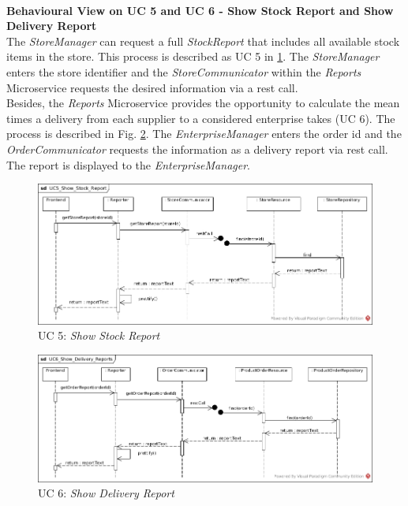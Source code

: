		 \noindent
		 \\
		\textbf{Behavioural View on UC 5 and UC 6 - Show Stock Report and Show Delivery Report} \\
		The \textit{StoreManager} can request a full \textit{StockReport} that includes all available stock items in the store. This process is described as UC 5 in \ref{MS_UC5}. The \textit{StoreManager} enters the store identifier and the \textit{StoreCommunicator} within the \textit{Reports} Microservice requests the desired information via a rest call.
		\\
		Besides, the \textit{Reports} Microservice provides the opportunity to calculate the mean times a delivery from each supplier to a considered enterprise takes (UC 6). The process is described in  Fig. \ref{MS_UC6}. The \textit{EnterpriseManager} enters the order id and the \textit{OrderCommunicator} requests the information as a delivery report via rest call. The report is displayed to the \textit{EnterpriseManager}.
		
	
			
			\begin{figure}[!h]
				\centering
				\includegraphics[width = 1\textwidth]{img/UC5_Show_Stock_Report.jpg}
				\caption{UC 5: \textit{Show Stock Report}}
				\label{MS_UC5}
			\end{figure}
			
			\begin{figure}[!h]
				\centering
				\includegraphics[width = 1\textwidth]{img/UC6_Show_Delivery_Reports.jpg}
				\caption{UC 6: \textit{Show Delivery Report}}
				\label{MS_UC6}
			\end{figure}
			
